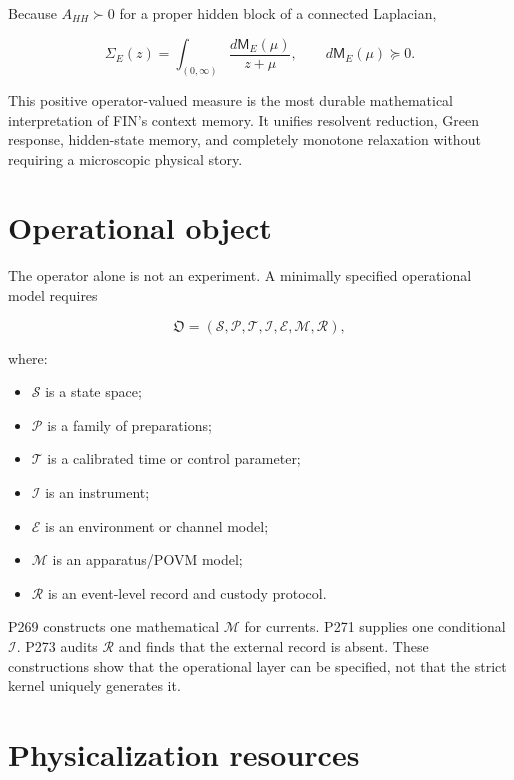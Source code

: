 \documentclass[11pt,a4paper,openany]{report}
\begin{document}
Because \(A_{HH}\succ0\) for a proper hidden block of a connected Laplacian,

\[
\Sigma_E(z)
=
\int_{(0,\infty)}
\frac{d\mathsf M_E(\mu)}{z+\mu},
\qquad
d\mathsf M_E(\mu)\succeq0.
\]

This positive operator-valued measure is the most durable mathematical interpretation of FIN's context memory. It unifies resolvent reduction, Green response, hidden-state memory, and completely monotone relaxation without requiring a microscopic physical story.

\section{Operational object}

The operator alone is not an experiment. A minimally specified operational model requires

\[
\mathfrak O
=
(\mathcal S,\mathcal P,\mathcal T,\mathcal I,
\mathcal E,\mathcal M,\mathcal R),
\]

where:

\begin{itemize}
\item 
\(\mathcal S\) is a state space;

\item 
\(\mathcal P\) is a family of preparations;

\item 
\(\mathcal T\) is a calibrated time or control parameter;

\item 
\(\mathcal I\) is an instrument;

\item 
\(\mathcal E\) is an environment or channel model;

\item 
\(\mathcal M\) is an apparatus/\allowbreak{}POVM model;

\item 
\(\mathcal R\) is an event-level record and custody protocol.

\end{itemize}

P269 constructs one mathematical \(\mathcal M\) for currents. P271 supplies one conditional \(\mathcal I\). P273 audits \(\mathcal R\) and finds that the external record is absent. These constructions show that the operational layer can be specified, not that the strict kernel uniquely generates it.

\section{Physicalization resources}
\end{document}
